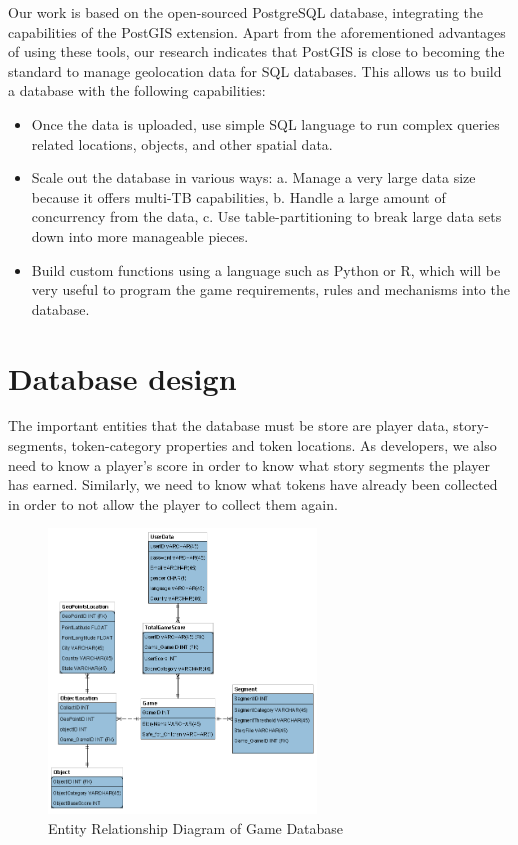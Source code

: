 \documentclass[conference]{IEEEtran}
\begin{document}
Our work is based on the open-sourced PostgreSQL database, integrating the capabilities of the PostGIS extension. Apart from the aforementioned advantages of using these tools, our research indicates that PostGIS is close to becoming the standard to manage geolocation data for SQL databases.  This allows us to build a database with the following capabilities:
\begin{itemize}
\item	Once the data is uploaded, use simple SQL language to run complex queries related locations, objects, and other spatial data. 
\item Scale out the database in various ways: a. Manage a very large data size because it offers multi-TB capabilities, b. Handle a large amount of concurrency from the data, c. Use table-partitioning to break large data sets down into more manageable pieces.
\item Build custom functions using a language such as Python or R, which will be very useful to program the game requirements, rules and mechanisms into the database. 
\end{itemize}

\section{Database design}

The important entities that the database must be store are player data, story-segments, token-category properties and token locations. As developers, we also need to know a player’s score in order to know what story segments the player has earned. Similarly, we need to know what tokens have already been collected in order to not allow the player to collect them again. 

\begin{figure}[h]
\centering
\includegraphics[width=2.8in]{imgs/MSDS7330_FinalProj_Prelim_ER2.png}
\caption{Entity Relationship Diagram of Game Database}
\label{ERD}
\end{figure}
\end{document}
